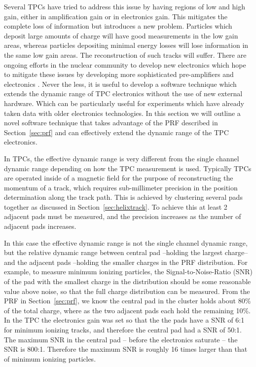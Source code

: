 Several TPCs have tried to address this issue by having regions of low and high gain, either in amplification gain or in electronics gain. This mitigates the complete loss of information but introduces a new problem. Particles which deposit large amounts of charge will have good measurements in the low gain areas, whereas particles depositing minimal energy losses will lose information in the same low gain areas. The reconstruction of such tracks will suffer. There are ongoing efforts in the nuclear community to develop new electronics which hope to mitigate these issues by developing more sophisticated  pre-amplifiers and electronics \cite{feanics,feanics2}.  Never the less, it is useful to develop a software technique which extends the dynamic range of TPC electronics without the use of new external hardware. Which can be particularly useful for experiments which have already taken data with older electronics technologies. In this section we will outline a novel software technique that takes advantage of the PRF described in Section~\ref{sec:prf} and can effectively extend the dynamic range of the TPC electronics. 

In TPCs, the effective dynamic range is very different from the single channel dynamic range depending on how the TPC measurement is used. Typically TPCs are operated inside of a magnetic field for the purpose of reconstructing the momentum of a track, which requires sub-millimeter precision in the position determination along the track path. This is achieved by clustering several pads together as discussed in Section~\ref{sec:helixtrack}. To achieve this at least 2 adjacent pads must be measured, and the precision increases as the number of adjacent pads increases. 

In this case the effective dynamic range is not the single channel dynamic range, but the relative dynamic range between central pad --holding the largest charge-- and the adjacent pads --holding the smaller charges in the PRF distribution. For example, to measure minimum ionizing particles, the Signal-to-Noise-Ratio (SNR) of the pad with the smallest charge in the distribution should be some reasonable value above noise, so that the full charge distribution can be measured. From the PRF in Section~\ref{sec:prf}, we know the central pad in the cluster holds about 80\% of the total charge, where as the two adjacent pads each hold the remaining 10\%. In the \spirit TPC the electronics gain was set so that the the pads have a SNR of 6:1 for minimum ionizing tracks, and therefore the central pad had a SNR of 50:1. The maximum SNR in the central pad -- before the electronics saturate -- the SNR is 800:1. Therefore the maximum SNR is roughly 16 times larger than that of minimum ionizing particles. 


